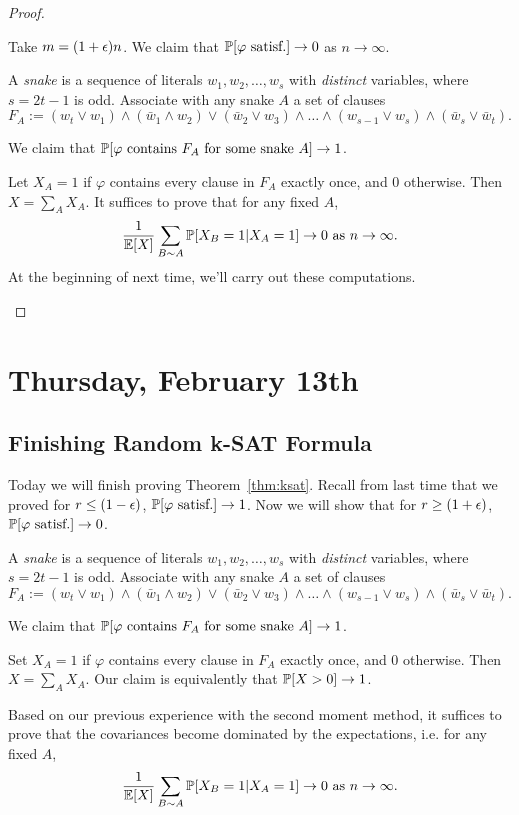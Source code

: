\documentclass[11 pt]{scrartcl}
\newcommand{\satisf}{\text{ satisf.}}
\begin{document}
\begin{proof}
\begin{enumerate}[(i)]
        \ii Take $m = (1+\epsilon)n$. We claim that $\mathbb P[\varphi\text{ satisf.}] \to 0$ as $n\to \infty$. 

        A \emph{snake} is a sequence of literals $w_1, w_2, \dots, w_s$ with \emph{distinct} variables, where $s = 2t - 1$ is odd. Associate with any snake $A$ a set of clauses 
        \[ F_A := (w_t \lor w_1) \land (\bar{w}_1\land w_2) \lor (\bar{w}_2 \lor w_3) \land \dots \land (w_{s-1}\lor w_s) \land (\bar{w}_s \lor \bar{w}_t).\]

        We claim that $\mathbb P[\varphi\text{ contains }F_A\text{ for some snake }A] \to 1$. 

        Let $X_A = 1$ if $\varphi$ contains every clause in $F_A$ exactly once, and 0 otherwise. Then $X = \sum_A X_A$. It suffices to prove that for any fixed $A$, 
        \[ \dfrac{1}{\mathbb E[X]} \sum_{B\sim A} \mathbb P[X_B = 1| X_A = 1] \to 0\text{ as } n\to\infty.\]
        At the beginning of next time, we'll carry out these computations. 
    \end{enumerate}
\end{proof}

\newpage
\section{Thursday, February 13th}
\subsection{Finishing Random k-SAT Formula}

Today we will finish proving Theorem~\ref{thm:ksat}. Recall from last time that we proved for $r \leq (1-\epsilon)$,  $\mathbb P[\varphi\text{ satisf.}] \to 1$. Now we will show that for $r \geq (1+\epsilon)$, $\PP[\varphi\satisf] \to 0$. 

 A \emph{snake} is a sequence of literals $w_1, w_2, \dots, w_s$ with \emph{distinct} variables, where $s = 2t - 1$ is odd. Associate with any snake $A$ a set of clauses 
        \[ F_A := (w_t \lor w_1) \land (\bar{w}_1\land w_2) \lor (\bar{w}_2 \lor w_3) \land \dots \land (w_{s-1}\lor w_s) \land (\bar{w}_s \lor \bar{w}_t).\]

    We claim that $\mathbb P[\varphi\text{ contains }F_A\text{ for some snake }A] \to 1$. 

    Set $X_A = 1$ if $\varphi$ contains every clause in $F_A$ exactly once, and 0 otherwise. Then $X = \sum_A X_A$. Our claim is equivalently that $\mathbb P[X > 0] \to 1$. 

    Based on our previous experience with the second moment method, it suffices to prove that the covariances become dominated by the expectations, i.e. for any fixed $A$, 
    \[ \dfrac{1}{\mathbb E[X]} \sum_{B\sim A} \mathbb P[X_B = 1| X_A = 1] \to 0\text{ as } n\to\infty.\]
\end{document}
